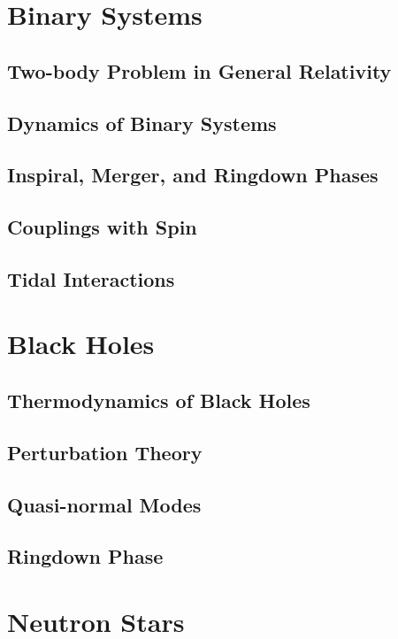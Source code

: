 \section{Binary Systems}\label{sec:binary-systems}
\subsection{Two-body Problem in General Relativity}\label{subsec:two-body-problem}
\subsection{Dynamics of Binary Systems}\label{subsec:dynamics-of-binary-systems}
\subsection{Inspiral, Merger, and Ringdown Phases}\label{subsec:inspiral-merger-and-ringdown-phases}
\subsection{Couplings with Spin}\label{subsec:couplings-with-spin}
\subsection{Tidal Interactions}\label{subsec:tidal-interactions}
\section{Black Holes}\label{sec:black-holes}
\subsection{Thermodynamics of Black Holes}\label{subsec:thermodynamics-of-black-holes}
\subsection{Perturbation Theory}\label{subsec:perturbation-theory}
\subsection{Quasi-normal Modes}\label{subsec:quasi-normal-modes}
\subsection{Ringdown Phase}\label{subsec:ringdown-phase}
\section{Neutron Stars}\label{sec:neutron-stars}
